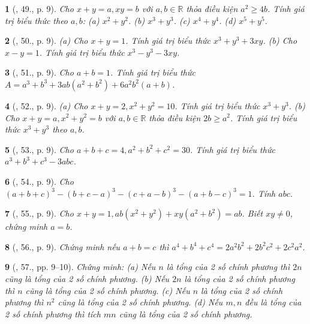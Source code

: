 \documentclass{article}
\newtheorem{baitoan}{}
\begin{document}
\begin{baitoan}[\cite{Binh_Toan_8_tap_1}, 49., p. 9]
	Cho $x + y = a,xy = b$ với $a,b\in\mathbb{R}$ thỏa điều kiện $a^2\ge4b$. Tính giá trị biểu thức theo $a,b$: (a) $x^2 + y^2$. (b) $x^3 + y^3$. (c) $x^4 + y^4$. (d) $x^5 + y^5$.
\end{baitoan}

\begin{baitoan}[\cite{Binh_Toan_8_tap_1}, 50., p. 9]
	(a) Cho $x + y = 1$. Tính giá trị biểu thức $x^3 + y^3 + 3xy$. (b) Cho $x - y = 1$. Tính giá trị biểu thức $x^3 - y^3 - 3xy$. 
\end{baitoan}

\begin{baitoan}[\cite{Binh_Toan_8_tap_1}, 51., p. 9]
	Cho $a + b = 1$. Tính giá trị biểu thức $A = a^3 + b^3 + 3ab(a^2 + b^2) + 6a^2b^2(a + b)$.
\end{baitoan}

\begin{baitoan}[\cite{Binh_Toan_8_tap_1}, 52., p. 9]
	(a) Cho $x + y = 2,x^2 + y^2 = 10$. Tính giá trị biểu thức $x^3 + y^3$. (b) Cho $x + y = a,x^2 + y^2 = b$ với $a,b\in\mathbb{R}$ thỏa điều kiện $2b\ge a^2$. Tính giá trị biểu thức $x^3 + y^3$ theo $a,b$.
\end{baitoan}

\begin{baitoan}[\cite{Binh_Toan_8_tap_1}, 53., p. 9]
	Cho $a + b + c = 4,a^2 + b^2 + c^2 = 30$. Tính giá trị biểu thức $a^3 + b^3 + c^3 - 3abc$.
\end{baitoan}

\begin{baitoan}[\cite{Binh_Toan_8_tap_1}, 54., p. 9]
	Cho $(a + b + c)^3 - (b + c - a)^3 - (c + a - b)^3 - (a + b - c)^3 = 1$. Tính $abc$.
\end{baitoan}

\begin{baitoan}[\cite{Binh_Toan_8_tap_1}, 55., p. 9]
	Cho $x + y = 1,ab(x^2 + y^2) + xy(a^2 + b^2) = ab$. Biết $xy\ne0$, chứng minh $a = b$.
\end{baitoan}

\begin{baitoan}[\cite{Binh_Toan_8_tap_1}, 56., p. 9]
	Chứng minh nếu $a + b = c$ thì $a^4 + b^4 + c^4 = 2a^2b^2 + 2b^2c^2 + 2c^2a^2$.
\end{baitoan}

\begin{baitoan}[\cite{Binh_Toan_8_tap_1}, 57., pp. 9--10]
	Chứng minh: (a) Nếu $n$ là tổng của 2 số chính phương thì $2n$ cũng là tổng của 2 số chính phương. (b) Nếu $2n$ là tổng của 2 số chính phương thì $n$ cũng là tổng của 2 số chính phương. (c) Nếu $n$ là tổng của 2 số chính phương thì $n^2$ cũng là tổng của 2 số chính phương. (d) Nếu $m,n$ đều là tổng của 2 số chính phương thì tích $mn$ cũng là tổng của 2 số chính phương.
\end{baitoan}
\end{document}
